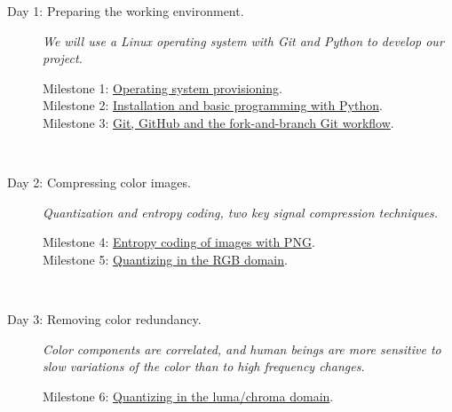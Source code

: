 \begin{description}
\item [Day 1: {\normalfont Preparing the working
    environment.}] \emph{We will use a Linux operating system with
  Git and Python to develop our project.}
  \begin{description}
  \item [Milestone 1: {\normalfont \href{https://sistemas-multimedia.github.io/milestones/01-provisioning/}{Operating system provisioning}.}]
  \item [Milestone 2: {\normalfont \href{https://sistemas-multimedia.github.io/milestones/02-python/}{Installation and basic programming with Python}.}]
  \item [Milestone 3: {\normalfont \href{https://sistemas-multimedia.github.io/milestones/03-git/}{Git, GitHub and the fork-and-branch Git workflow}.}]
  \end{description}
  ~\newline

\item [Day 2: {\normalfont Compressing color images.}] \emph{Quantization and entropy coding, two key signal compression techniques.}
  \begin{description}
  \item [Milestone 4: {\normalfont \href{https://sistemas-multimedia.github.io/milestones/04-Motion_PNG/}{Entropy coding of images with PNG}.}]
  \item [Milestone 5: {\normalfont \href{https://sistemas-multimedia.github.io/milestones/05-RGB_quantization/}{Quantizing in the RGB domain}.}]
  \end{description}
  ~\newline

\item [Day 3: {\normalfont Removing color redundancy.}] \emph{Color
    components are correlated, and human beings are more sensitive to
    slow variations of the color than to high frequency changes.}
  \begin{description}
   \item [Milestone 6: {\normalfont \href{https://sistemas-multimedia.github.io/milestones/06-YUV_quantization/}{Quantizing in the luma/chroma domain}.}]
  \end{description}
  ~\newline


\end{description}
